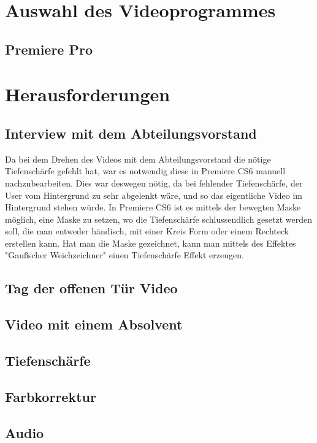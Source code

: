 \section{Auswahl des Videoprogrammes}
\renewcommand{\kapitelautor}{Autor: Kerstin Schön}

\subsection{Premiere Pro}

\section{Herausforderungen}
\renewcommand{\kapitelautor}{Autor: Kerstin Schön}
\subsection{Interview mit dem Abteilungsvorstand}
Da bei dem Drehen des Videos mit dem Abteilungsvorstand die nötige Tiefenschärfe gefehlt hat, war es notwendig diese in Premiere CS6 manuell nachzubearbeiten. Dies war deswegen nötig, da bei fehlender Tiefenschärfe, der User vom Hintergrund zu sehr abgelenkt wäre, und so das eigentliche Video im Hintergrund stehen würde.
In Premiere CS6 ist es mittels der bewegten Maske möglich, eine Maske zu setzen, wo die Tiefenschärfe schlussendlich gesetzt werden soll, die man entweder händisch, mit einer Kreis Form oder einem Rechteck erstellen kann. Hat man die Maske gezeichnet, kann man mittels des Effektes "Gaußscher Weichzeichner" einen Tiefenschärfe Effekt erzeugen.
\subsection{Tag der offenen Tür Video}
\subsection{Video mit einem Absolvent}

\subsection{Tiefenschärfe}
\subsection{Farbkorrektur}
\subsection{Audio}

